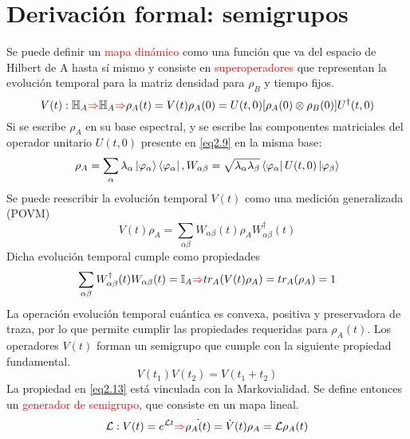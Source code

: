 \documentclass{book}
\begin{document}
\section{Derivación formal: semigrupos}
Se puede definir un \textcolor{red}{mapa dinámico} como una función que va del espacio de Hilbert de A hasta sí mismo y consiste en \textcolor{red}{superoperadores} que representan la evolución temporal para la matriz densidad para $\rho_B$ y tiempo fijos.
\begin{equation}\label{eq2.9}V(t):\mathbb{H}_A\textcolor{red}{\Rightarrow}\mathbb{H}_A\textcolor{red}{\Rightarrow} \rho_A(t)=V(t)\rho_A(0)=U(t,0)[\rho_A(0)\otimes\rho_B(0)]U^\dag(t,0) \end{equation}
Si se escribe $\rho_A$ en su base espectral, y se escribe las componentes matriciales del operador unitario $U(t,0)$ presente en \textcolor{blue}{\ref{eq2.9}} en la misma base:
\begin{equation}\label{eq2.10}\rho_A=\sum_\alpha\lambda_\alpha\ket{\varphi_\alpha}\bra{\varphi_\alpha}, W_{\alpha\beta}=\sqrt{\lambda_\alpha\lambda_\beta}\bra{\varphi_\alpha}U(t,0)\ket{\varphi_\beta}\end{equation}
Se puede reescribir la evolución temporal $V(t)$ como una medición generalizada (POVM)
\begin{equation}\label{eq2.11}V(t)\rho_A=\sum_{\alpha\beta}W_{\alpha\beta}(t)\rho_AW^\dag_{\alpha\beta}(t)\end{equation}
Dicha evolución temporal cumple como propiedades
\begin{equation}\label{eq2.12} \sum_{\alpha\beta}W_{\alpha\beta}^\dag(t)W_{\alpha\beta}(t)=\mathbb{I}_A\textcolor{red}{\Rightarrow} tr_A(V(t)\rho_A)=tr_A(\rho_A)=1\end{equation}
La operación evolución temporal cuántica es convexa, positiva y preservadora de traza, por lo que permite cumplir las propiedades requeridas para $\rho_A(t)$. Los operadores $V(t)$ forman un semigrupo que cumple con la siguiente propiedad fundamental.
\begin{equation}\label{eq2.13}V(t_1)V(t_2)=V(t_1+t_2) \end{equation}
La propiedad en \textcolor{blue}{\ref{eq2.13}} está vinculada con la Markovialidad.
Se define entonces un \textcolor{red}{generador de semigrupo}, que consiste en un mapa lineal.
\begin{equation}\label{eq2.14}\mathcal{L}:V(t)=e^{\mathcal{L}t}\textcolor{red}{\Rightarrow} \dot{\rho_A(t)}=\dot{V}(t)\rho_A=\mathcal{L}\rho_A(t)\end{equation}
\end{document}
